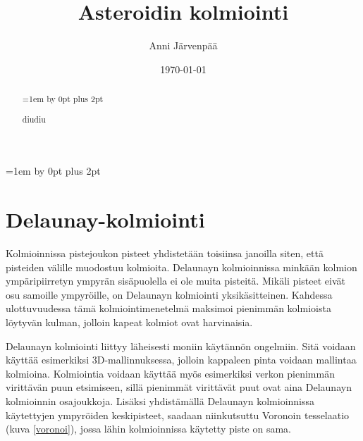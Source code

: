 \documentclass[12pt,a4paper,titlepage]{article}
\title{Asteroidin kolmiointi\vspace{0.5em}}
\author{Anni Järvenpää}
\date{\today}
\begin{document}
\maketitle
{}
\begin{abstract}
\setlength{\parindent}{0pt}
\parskip=1em \advance\parskip by 0pt plus 2pt
\onehalfspacing

\noindent
diudiu
\end{abstract}
\restoregeometry

\newpage
\thispagestyle{empty}
\tableofcontents
\newpage
\setcounter{page}{1}
\parskip=1em \advance\parskip by 0pt plus 2pt
\pagestyle{fancy}


\section{Delaunay-kolmiointi}
Kolmioinnissa pistejoukon pisteet yhdistetään toisiinsa janoilla siten, että pisteiden välille muodostuu kolmioita. Delaunayn kolmioinnissa minkään kolmion ympäripiirretyn ympyrän sisäpuolella ei ole muita pisteitä. Mikäli pisteet eivät osu samoille ympyröille, on Delaunayn kolmiointi yksikäsitteinen. Kahdessa ulottuvuudessa tämä kolmiointimenetelmä maksimoi pienimmän kolmioista löytyvän kulman, jolloin kapeat kolmiot ovat harvinaisia. \cite{maur2002delaunay}

Delaunayn kolmiointi liittyy läheisesti moniin käytännön ongelmiin. Sitä voidaan käyttää esimerkiksi 3D-mallinnuksessa, jolloin kappaleen pinta voidaan mallintaa kolmioina. Kolmiointia voidaan käyttää myös esimerkiksi verkon pienimmän virittävän puun etsimiseen, sillä pienimmät virittävät puut ovat aina Delaunayn kolmioinnin osajoukkoja. Lisäksi yhdistämällä Delaunayn kolmioinnissa käytettyjen ympyröiden keskipisteet, saadaan niinkutsuttu Voronoin tesselaatio (kuva \ref{voronoi}), jossa lähin kolmioinnissa käytetty piste on sama. \cite{maur2002delaunay, peterson}
\end{document}
